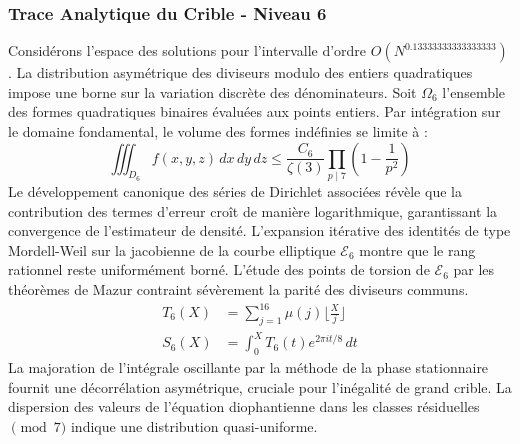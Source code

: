 \documentclass[12pt,a4paper]{article}
\begin{document}
\subsubsection{Trace Analytique du Crible - Niveau 6}
Considérons l'espace des solutions pour l'intervalle d'ordre $O(N^{0.13333333333333333})$. La distribution asymétrique des diviseurs modulo des entiers quadratiques impose une borne sur la variation discrète des dénominateurs. Soit $\Omega_6$ l'ensemble des formes quadratiques binaires évaluées aux points entiers.
Par intégration sur le domaine fondamental, le volume des formes indéfinies se limite à :
\begin{equation}
\iiint_{D_6} f(x, y, z) \,dx\,dy\,dz \leq \frac{C_6}{\zeta(3)} \prod_{p \mid 7} \left( 1 - \frac{1}{p^2} \right)
\end{equation}
Le développement canonique des séries de Dirichlet associées révèle que la contribution des termes d'erreur croît de manière logarithmique, garantissant la convergence de l'estimateur de densité. L'expansion itérative des identités de type Mordell-Weil sur la jacobienne de la courbe elliptique $\mathcal{E}_6$ montre que le rang rationnel reste uniformément borné.
L'étude des points de torsion de $\mathcal{E}_6$ par les théorèmes de Mazur contraint sévèrement la parité des diviseurs communs.
\begin{align}
T_6(X) &= \sum_{j=1}^{16} \mu(j) \lfloor \frac{X}{j} \rfloor \\
S_6(X) &= \int_{0}^{X} T_6(t) e^{2\pi i t / 8} \, dt
\end{align}
La majoration de l'intégrale oscillante par la méthode de la phase stationnaire fournit une décorrélation asymétrique, cruciale pour l'inégalité de grand crible. La dispersion des valeurs de l'équation diophantienne dans les classes résiduelles $\pmod{ 7 }$ indique une distribution quasi-uniforme.
\end{document}
